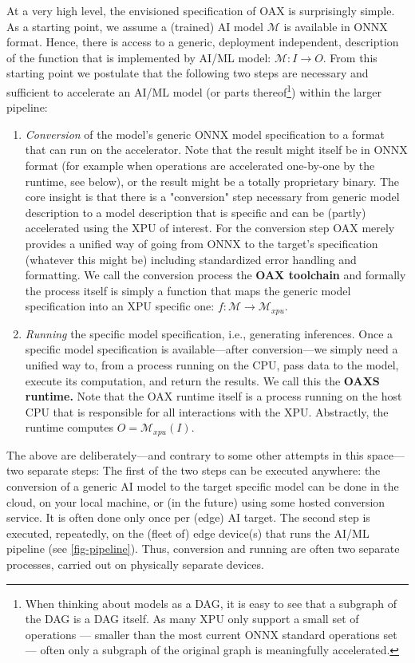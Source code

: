 \documentclass{article}
\begin{document}
At a very high level, the envisioned specification of OAX is surprisingly simple. As a starting point, we assume a (trained) AI model $\mathcal{M}$ is available in ONNX format. Hence, there is access to a generic, deployment independent, description of the function that is implemented by AI/ML model: $\mathcal{M} \colon I \to O$.  From this starting point we postulate that  the following two steps are necessary and sufficient to accelerate an AI/ML model (or parts thereof\footnote{When thinking about models as a DAG, it is easy to see that a subgraph of the DAG is a DAG itself. As many XPU only support a small set of operations --- smaller than the most current ONNX standard operations set --- often only a subgraph of the original graph is meaningfully accelerated.}) within the larger pipeline:

\begin{enumerate}
\item \emph{Conversion} of the model's generic ONNX model specification to a format that can run on the accelerator. Note that the result might itself be in ONNX format (for example when operations are accelerated one-by-one by the runtime, see below), or the result might be a totally proprietary binary. The core insight is that there is a "conversion" step necessary from generic model description to a model description that is specific and can be (partly) accelerated using the XPU of interest. For the conversion step OAX merely provides a unified way of going from ONNX to the target's specification (whatever this might be) including standardized error handling and formatting. We call the conversion process the \textbf{OAX toolchain} and formally the process itself is simply a function that maps the generic model specification into an XPU specific one: $f \colon \mathcal{M} \to \mathcal{M}_{xpu}$. 
\item \emph{Running} the specific model specification, i.e., generating inferences. Once a specific model specification is available---after conversion---we simply need a unified way to, from a process running on the CPU, pass data to the model, execute its computation, and return the results. We call this the \textbf{OAXS runtime.} Note that the OAX runtime itself is a process running on the host CPU that is responsible for all interactions with the XPU. Abstractly, the runtime computes $O = \mathcal{M}_{xpu}(I)$.
\end{enumerate}

The above are deliberately---and contrary to some other attempts in this space---two separate steps: The first of the two steps can be executed anywhere: the conversion of a generic AI model to the target specific model can be done in the cloud, on your local machine, or (in the future) using some hosted conversion service. It is often done only once per (edge) AI target. The second step is executed, repeatedly, on the (fleet of) edge device(s) that runs the AI/ML pipeline (see \ref{fig-pipeline}). Thus, conversion and running are often two separate processes, carried out on physically separate devices.
\end{document}
